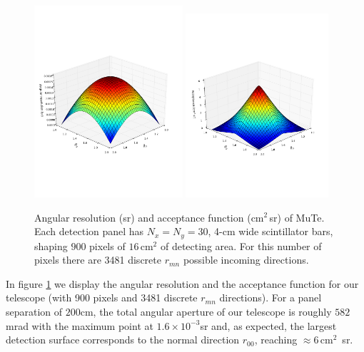 \documentclass[letterpaper,10pt,titlepage,linenumber]{article}
\begin{document}
\begin{figure}
\centering
{\includegraphics[width=0.49\textwidth]{Figures/angularresolution}}
{\includegraphics[width=0.47\textwidth]{Figures/acceptance}}
  \caption{Angular resolution (sr) and acceptance function (cm$^{2}$\,sr) of MuTe. Each detection panel has  $N_x=N_y=30$, 4-cm wide scintillator bars, shaping $900$ pixels of $16$\,cm$^2$ of detecting area. For this number of pixels there are  3481 discrete $r_{mn}$ possible incoming directions.}
  \label{acceptance}
\end{figure}

In figure \ref{acceptance} we display the angular resolution and the acceptance function for our telescope (with 900 pixels and 3481 discrete $r_{mn}$ directions). For a panel separation of $200$cm, the total angular aperture of our telescope is roughly $582$mrad with the maximum point at $1.6\times 10^{-3}$sr and, as expected, the largest detection surface corresponds to the normal direction $r_{00}$, reaching $\approx 6$\,cm$^{2}$\, sr.
\end{document}
